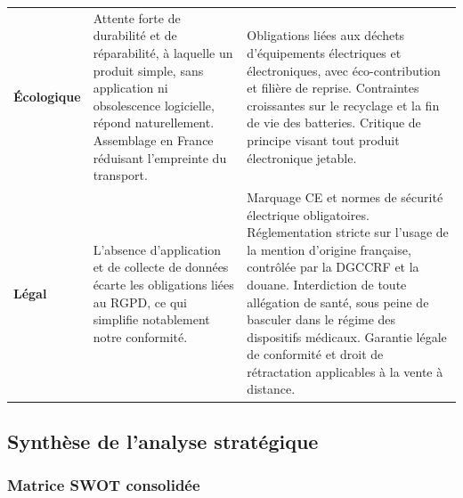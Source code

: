 \begin{center}
\begin{xltabular}{\textwidth}{P{3.2cm}LL}
\textbf{Écologique}
&
Attente forte de durabilité et de réparabilité, à laquelle un produit simple,
sans application ni obsolescence logicielle, répond naturellement. Assemblage
en France réduisant l'empreinte du transport.
&
Obligations liées aux déchets d'équipements électriques et électroniques, avec
éco-contribution et filière de reprise. Contraintes croissantes sur le
recyclage et la fin de vie des batteries. Critique de principe visant tout
produit électronique jetable. \\

\textbf{Légal}
&
L'absence d'application et de collecte de données écarte les obligations liées
au RGPD, ce qui simplifie notablement notre conformité.
&
Marquage CE et normes de sécurité électrique obligatoires. Réglementation
stricte sur l'usage de la mention d'origine française, contrôlée par la DGCCRF
et la douane. Interdiction de toute allégation de santé, sous peine de
basculer dans le régime des dispositifs médicaux. Garantie légale de
conformité et droit de rétractation applicables à la vente à distance. \\
\bottomrule
\end{xltabular}
\end{center}

\clearpage
\subsection{Synthèse de l'analyse stratégique}

\subsubsection{Matrice SWOT consolidée}


